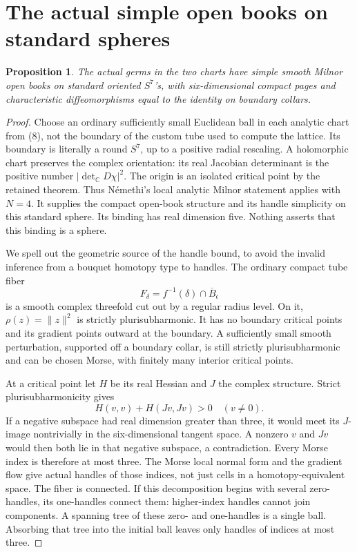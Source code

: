 \documentclass[11pt]{article}
\newtheorem{proposition}[theorem]{Proposition}
\newcommand{\C}{\mathbb C}
\begin{document}
\section{The actual simple open books on standard spheres}

\begin{proposition}\label{prop:simple}
The actual germs in the two charts have simple smooth Milnor open
books on standard oriented \(S^7\)'s, with six-dimensional compact
pages and characteristic diffeomorphisms equal to the identity on
boundary collars.
\end{proposition}

\begin{proof}
Choose an ordinary sufficiently small Euclidean ball in each analytic
chart from (8), not the boundary of the custom tube used to compute
the lattice. Its boundary is literally a round \(S^7\), up to a
positive radial rescaling. A holomorphic chart preserves the complex
orientation: its real Jacobian determinant is the positive number
\(\lvert\det_{\C}D\chi\rvert^2\).
The origin is an isolated critical point by the retained theorem.
Thus N\'emethi's local analytic Milnor statement applies with \(N=4\).
It supplies the compact open-book structure and its handle
simplicity on this standard sphere. Its binding has real dimension
five. Nothing asserts that this binding is a sphere.

We spell out the geometric source of the handle bound, to avoid the
invalid inference from a bouquet homotopy type to handles.
The ordinary compact tube fiber
\[
F_\delta=f^{-1}(\delta)\cap\overline B_\epsilon
\]
is a smooth complex threefold cut out by a regular radius level.
On it, \(\rho(z)=\lVert z\rVert^2\) is strictly plurisubharmonic.
It has no boundary critical points and its gradient points outward
at the boundary. A sufficiently small smooth perturbation, supported
off a boundary collar, is still strictly plurisubharmonic and can
be chosen Morse, with finitely many interior critical points.

At a critical point let \(H\) be its real Hessian and \(J\) the
complex structure. Strict plurisubharmonicity gives
\[
H(v,v)+H(Jv,Jv)>0\quad(v\ne0).
\]
If a negative subspace had real dimension greater than three,
it would meet its \(J\)-image nontrivially in the six-dimensional
tangent space. A nonzero \(v\) and \(Jv\) would then both lie in that
negative subspace, a contradiction. Every Morse index is therefore
at most three. The Morse local normal form and the gradient flow
give actual handles of those indices, not just cells in a
homotopy-equivalent space.
The fiber is connected. If this decomposition begins with several
zero-handles, its one-handles connect them: higher-index handles
cannot join components. A spanning tree of these zero- and
one-handles is a single ball. Absorbing that tree into the initial
ball leaves only handles of indices at most three.


\end{proof}
\end{document}
